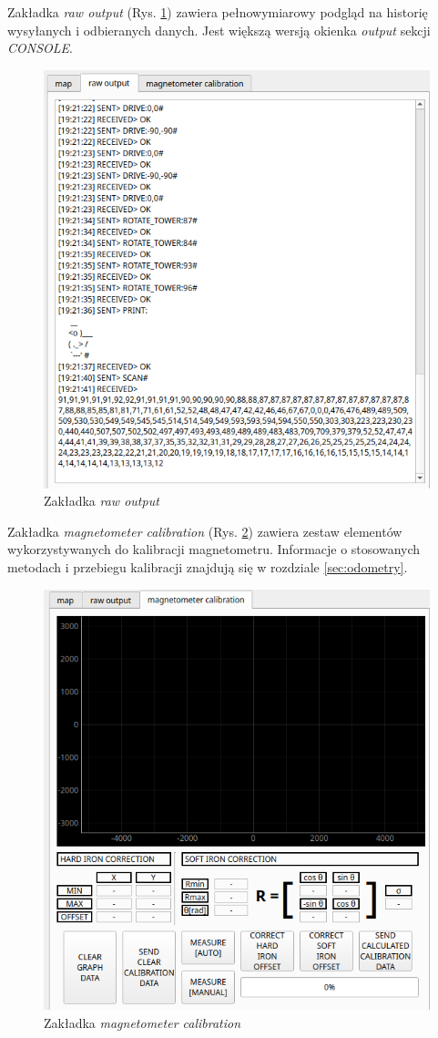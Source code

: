 Zakładka \emph{raw output} (Rys. \ref{fig:main-app-raw-output-section}) zawiera pełnowymiarowy podgląd na historię wysyłanych i odbieranych danych. Jest większą wersją okienka \emph{output} sekcji \emph{CONSOLE}.
\begin{figure}[ht]
	\centering
		\includegraphics[width=0.8\linewidth]{rys/main-app-view-raw-output.PNG}
	\caption{Zakładka \emph{raw output}}
	\label{fig:main-app-raw-output-section}
\end{figure}

Zakładka \emph{magnetometer calibration} (Rys. \ref{fig:main-app-mag-section}) zawiera zestaw elementów wykorzystywanych do kalibracji magnetometru. Informacje o stosowanych metodach i przebiegu kalibracji znajdują się w rozdziale \ref{sec:odometry}.
\begin{figure}[ht]
	\centering
		\includegraphics[width=0.8\linewidth]{rys/main-app-view-magnetom.PNG}
	\caption{Zakładka \emph{magnetometer calibration}}
	\label{fig:main-app-mag-section}
\end{figure}


